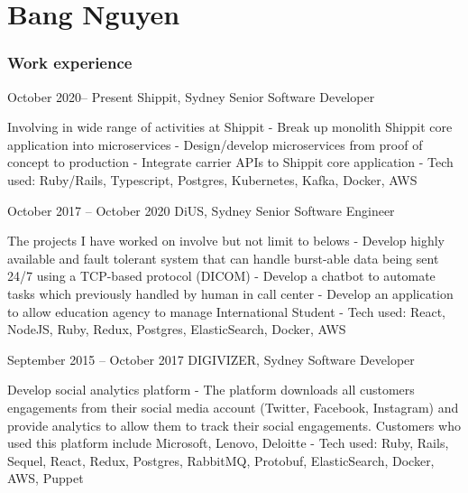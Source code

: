 \documentclass{tccv}
\begin{document}
\part{Bang Nguyen}

\section{Work experience}

\begin{eventlist}

\item{October 2020-- Present}
    {Shippit, Sydney}
    {Senior Software Developer}

    Involving in wide range of activities at Shippit
    \newline- Break up monolith Shippit core application into microservices
    \newline- Design/develop microservices from proof of concept to production
    \newline- Integrate carrier APIs to Shippit core application
    \newline- Tech used: Ruby/Rails, Typescript, Postgres, Kubernetes, Kafka, Docker, AWS

\item{October 2017 -- October 2020}
    {DiUS, Sydney}
    {Senior Software Engineer}

    The projects I have worked on involve but not limit to belows
    \newline- Develop highly available and fault tolerant system that can handle
    burst-able data being sent 24/7 using a TCP-based protocol (DICOM)
    \newline- Develop a chatbot to automate tasks which previously handled by
    human in call center
    \newline- Develop an application to allow education agency to manage
    International Student
    \newline- Tech used: React, NodeJS, Ruby, Redux, Postgres, ElasticSearch, Docker, AWS

\item{September 2015 -- October 2017}
    {DIGIVIZER, Sydney}
    {Software Developer}

    Develop social analytics platform
    \newline- The platform downloads all customers engagements from their social
    media account (Twitter, Facebook, Instagram) and provide analytics to allow
    them to track their social engagements. Customers who used this platform
    include Microsoft, Lenovo, Deloitte
    \newline- Tech used: Ruby, Rails, Sequel, React, Redux, Postgres, RabbitMQ,
    Protobuf, ElasticSearch, Docker, AWS, Puppet


\end{eventlist}
\end{document}
